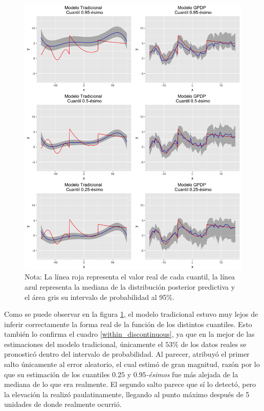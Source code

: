 \begin{figure}[htbp]
	\centering
	\caption{Ajuste de los modelos Tradicional y \textit{GPDP}, para un conjunto de datos simulados con discontinuidades.}
	\includegraphics[width=\textwidth]{Figures/Simulation/discontinuous/predictions.png}
	\captionsetup{singlelinecheck=off,font=footnotesize}
    \caption*{Nota: La l\'inea roja representa el valor real de cada cuantil, la l\'inea azul representa la mediana de la distribuci\'on posterior predictiva y el \'area gris su intervalo de probabilidad al 95\%.}
	\label{models_discontinuous}
\end{figure}

Como se puede observar en la figura \ref{models_discontinuous}, el modelo tradicional estuvo muy lejos de inferir correctamente la forma real de la funci\'on de los distintos cuantiles. Esto tambi\'en lo confirma el cuadro \ref{within_discontinuous}, ya que en la mejor de las estimaciones del modelo tradicional, \'unicamente el $53\%$ de los datos reales se pronostic\'o dentro del intervalo de probabilidad.
Al parecer, atribuy\'o el primer salto \'unicamente al error aleatorio, el cual estim\'o de gran magnitud, raz\'on por lo que su estimaci\'on de los cuantiles $0.25$ y $0.95$\textit{-\'esimos} fue m\'as alejada de la mediana de lo que era realmente. El segundo salto parece que s\'i lo detect\'o, pero la elevaci\'on la realiz\'o paulatinamente, llegando al punto m\'aximo despu\'es de 5 unidades de donde realmente ocurri\'o.


